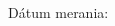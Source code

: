 \makeatletter
\begin{titlepage}
	\begin{center}
		
		\vspace*{100pt}
		
		\begin{spacing}{2.5}
			{\Huge\textbf{\@title}}	
		\end{spacing}	
			
	\end{center}

	\vfill

	Dátum merania: \measureDate
	\hfill
	\@author
\end{titlepage}
